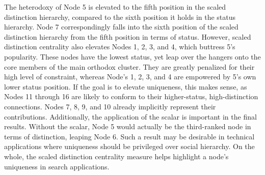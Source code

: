 

The heterodoxy of Node 5 is elevated to the fifth position in the scaled distinction hierarchy, compared to the sixth position it holds in the status hierarchy. Node 7 correspondingly falls into the sixth position of the scaled distinction hierarchy from the fifth position in terms of status. However, scaled distinction centrality also elevates Nodes 1, 2, 3, and 4, which buttress 5's popularity. These nodes have the lowest status, yet leap over the hangers onto the core members of the main orthodox cluster. They are greatly penalized for their high level of constraint, whereas Node's 1, 2, 3, and 4 are empowered by 5's own lower status position. If the goal is to elevate uniqueness, this makes sense, as Nodes 11 through 16 are likely to conform to their higher-status, high-distinction connections. Nodes 7, 8, 9, and 10 already implicitly represent their contributions. Additionally, the application of the scalar is important in the final results. Without the scalar, Node 5 would actually be the third-ranked node in terms of distinction, leaping Node 6. Such a result may be desirable in technical applications where uniqueness should be privileged over social hierarchy. On the whole, the scaled distinction centrality measure helps highlight a node's uniqueness in search applications. 